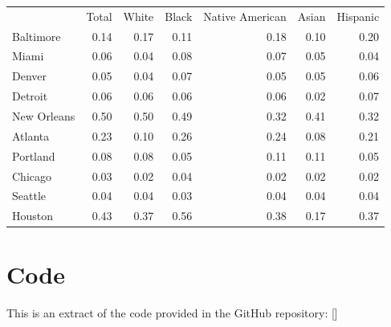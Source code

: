 \documentclass[final,3p,times,onecolumn,sort&compress]{elsarticle}
\begin{document}
\begin{table}[h]
\begin{tabular}{l|RRRRRR}
\hline
                                                                            & Total & White & Black & Native American & Asian & Hispanic \\
Baltimore                                                                   & 0.14  & 0.17  & 0.11  & 0.18            & 0.10  & 0.20     \\
Miami                                                                       & 0.06  & 0.04  & 0.08  & 0.07            & 0.05  & 0.04     \\
Denver                                                                      & 0.05  & 0.04  & 0.07  & 0.05            & 0.05  & 0.06     \\
Detroit                                                                     & 0.06  & 0.06  & 0.06  & 0.06            & 0.02  & 0.07     \\
New Orleans                                                                & 0.50  & 0.50  & 0.49  & 0.32            & 0.41  & 0.32     \\
Atlanta                                                                     & 0.23  & 0.10  & 0.26  & 0.24            & 0.08  & 0.21     \\
Portland                                                                    & 0.08  & 0.08  & 0.05  & 0.11            & 0.11  & 0.05     \\
Chicago                                                                     & 0.03  & 0.02  & 0.04  & 0.02            & 0.02  & 0.02     \\
Seattle                                                                     & 0.04  & 0.04  & 0.03  & 0.04            & 0.04  & 0.04     \\
Houston                                                                     & 0.43  & 0.37  & 0.56  & 0.38            & 0.17  & 0.37    
\end{tabular}
\end{table}


\clearpage
\newpage
\section{Code}
\label{appendix:code}

This is an extract of the code provided in the GitHub repository: []
\end{document}
